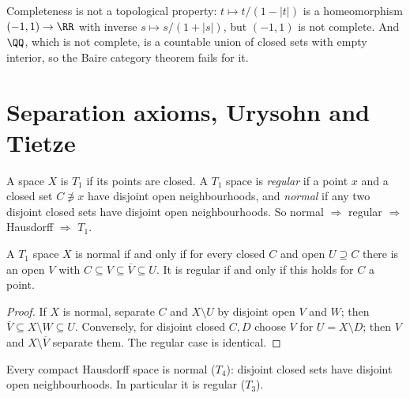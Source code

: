 \begin{counterexample}\label{general-topology:counterexample-completeness-not-topological}
Completeness is not a topological property: $t \mapsto t/(1 - |t|)$ is a homeomorphism $(-1, 1) \to \RR$ with inverse $s \mapsto s/(1 + |s|)$, but
$(-1, 1)$ is not complete. And $\QQ$, which is not complete, is a countable union of closed sets with empty interior, so the Baire category theorem fails
for it.
\end{counterexample}

\section{Separation axioms, Urysohn and Tietze}\label{general-topology:section-separation}

\begin{definition}\label{general-topology:definition-separation}
A space $X$ is \emph{$T_1$} if its points are closed. A $T_1$ space is \emph{regular} if a point $x$ and a closed set $C \not\ni x$ have disjoint open
neighbourhoods, and \emph{normal} if any two disjoint closed sets have disjoint open neighbourhoods. So normal $\Rightarrow$ regular $\Rightarrow$
Hausdorff $\Rightarrow$ $T_1$.
\end{definition}

\begin{lemma}\label{general-topology:lemma-normal-shrinking}
A $T_1$ space $X$ is normal if and only if for every closed $C$ and open $U \supseteq C$ there is an open $V$ with $C \subseteq V \subseteq \overline{V} \subseteq U$.
It is regular if and only if this holds for $C$ a point.
\end{lemma}

\begin{proof}
If $X$ is normal, separate $C$ and $X \setminus U$ by disjoint open $V$ and $W$; then $\overline{V} \subseteq X \setminus W \subseteq U$. Conversely, for
disjoint closed $C, D$ choose $V$ for $U = X \setminus D$; then $V$ and $X \setminus \overline{V}$ separate them. The regular case is identical.
\end{proof}

\begin{theorem}\label{general-topology:theorem-compact-hausdorff-normal}
Every compact Hausdorff space is normal ($T_4$): disjoint closed sets have disjoint open neighbourhoods. In particular it is regular ($T_3$).
\end{theorem}

